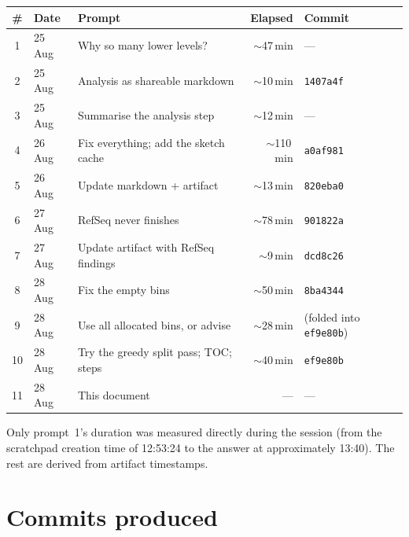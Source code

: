 \documentclass[11pt,a4paper]{article}
\newcommand{\sha}[1]{\texttt{#1}}
\begin{document}
\begin{longtable}{@{}clp{5.0cm}rl@{}}
\toprule
\textbf{\#} & \textbf{Date} & \textbf{Prompt} & \textbf{Elapsed} & \textbf{Commit} \\
\midrule
\endhead
1  & 25 Aug & Why so many lower levels?            & ${\sim}$47\,min & --- \\
2  & 25 Aug & Analysis as shareable markdown       & ${\sim}$10\,min & \sha{1407a4f} \\
3  & 25 Aug & Summarise the analysis step          & ${\sim}$12\,min & --- \\
4  & 26 Aug & Fix everything; add the sketch cache & ${\sim}$110\,min & \sha{a0af981} \\
5  & 26 Aug & Update markdown + artifact           & ${\sim}$13\,min & \sha{820eba0} \\
6  & 27 Aug & RefSeq never finishes                & ${\sim}$78\,min & \sha{901822a} \\
7  & 27 Aug & Update artifact with RefSeq findings & ${\sim}$9\,min  & \sha{dcd8c26} \\
8  & 28 Aug & Fix the empty bins                   & ${\sim}$50\,min & \sha{8ba4344} \\
9  & 28 Aug & Use all allocated bins, or advise    & ${\sim}$28\,min & (folded into \sha{ef9e80b}) \\
10 & 28 Aug & Try the greedy split pass; TOC; steps & ${\sim}$40\,min & \sha{ef9e80b} \\
11 & 28 Aug & This document                        & ---             & --- \\
\bottomrule
\end{longtable}

\noindent
Only prompt~1's duration was measured directly during the session (from the scratchpad creation
time of 12:53:24 to the answer at approximately 13:40). The rest are derived from artifact
timestamps.

\section{Commits produced}
\end{document}
